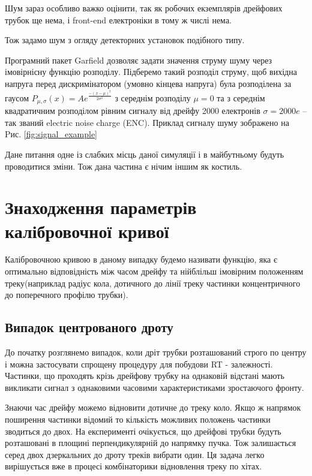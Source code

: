 \documentclass[]{article}
\begin{document}
	Шум зараз особливо важко оцінити, так як робочих екземплярів дрейфових трубок ще нема, і front-end електроніки в тому ж числі нема.
	
	Тож задамо шум з огляду детекторних установок подібного типу.
	
	Програмний пакет Garfield дозволяє задати значення струму шуму через імовірнісну функцію розподілу. Підберемо такий розподіл струму, щоб вихідна напруга перед дискримінатором (умовно кінцева напруга) була розподілена за гаусом 
	$P_{\mu,\sigma}(x) = Ae^{\frac{-(x-\mu)^2}{2\sigma^2}}$ 
	з середнім розподілу $\mu=0$ та з середнім квадратичним розподілом рівним сигналу від дрейфу 2000 електронів $ \sigma = 2000e$ -- так званий electric noise charge (ENC). Приклад сигналу шуму зображено на Pис. \ref{fig:signal_example}
	
	Дане питання одне із слабких місць даної симуляції і в майбутньому будуть проводитися зміни. Тож дана частина є нічим іншим як костиль.

	
	\section{Знаходження параметрів калібровочної кривої}
	
	Калібровочною кривою в даному випадку будемо називати функцію, яка є оптимально відповідність між часом дрейфу та нійблільш імовірним положенням треку(наприклад радіус кола, дотичного до лінії треку частинки концентричного до поперечного профілю трубки).\\
		
	\subsection{Випадок центрованого дроту}
	До початку розглянемо випадок, коли дріт трубки розташований строго по центру і можна застосувати спрощену процедуру для побудови RT - залежності. Частинки, що проходять крізь дрейфову трубку на однаковій відстані мають викликати сигнал з однаковими часовими характеристиками зростаючого фронту. 
	
	Знаючи час дрейфу можемо відновити дотичне до треку коло. Якщо ж напрямок поширення частинки відомий то кількість можливих положень частинки зводиться до двох. На експерименті очікується, що дрейфові трубки будуть розташовані в площині перпендикулярній до напрямку пучка. Тож залишається серед двох дзеркальних до дроту треків вибрати один. Ця задача легко вирішується вже в процесі комбінаторики відновлення треку по хітах.
	
\end{document}

